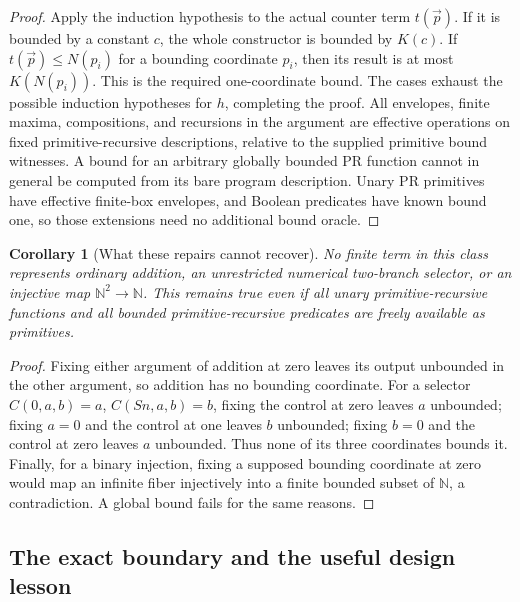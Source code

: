 \documentclass[11pt,letterpaper]{article}
\newtheorem{corollary}[theorem]{Corollary}
\theoremstyle{definition}\newtheorem{definition}[theorem]{Definition}
\theoremstyle{remark}\newtheorem{remark}[theorem]{Remark}
\begin{document}
\begin{proof}
Apply the induction hypothesis to the actual counter term $t(\vec p)$.
If it is bounded by a constant $c$, the whole constructor is bounded by
$K(c)$.  If $t(\vec p)\le N(p_i)$ for a bounding coordinate $p_i$, then
its result is at most $K(N(p_i))$.  This is the required one-coordinate
bound.  The cases exhaust the possible induction hypotheses for $h$,
completing the proof.  All envelopes, finite maxima, compositions, and
recursions in the argument are effective operations on fixed
primitive-recursive descriptions, relative to the supplied primitive bound
witnesses. A bound for an arbitrary globally bounded PR function cannot in
general be computed from its bare program description. Unary PR primitives
have effective finite-box envelopes, and Boolean predicates have known
bound one, so those extensions need no additional bound oracle.
\end{proof}

\begin{corollary}[What these repairs cannot recover]
\label{cor:single-body-exclusions}
No finite term in this class represents ordinary addition, an unrestricted
numerical two-branch selector, or an injective map
$\mathbb N^2\longrightarrow\mathbb N$.
This remains true even if all unary primitive-recursive functions and all
bounded primitive-recursive predicates are freely available as primitives.
\end{corollary}
\begin{proof}
Fixing either argument of addition at zero leaves its output unbounded
in the other argument, so addition has no bounding coordinate.
For a selector $C(0,a,b)=a$, $C(Sn,a,b)=b$, fixing the control at zero
leaves $a$ unbounded; fixing $a=0$ and the control at one leaves $b$
unbounded; fixing $b=0$ and the control at zero leaves $a$ unbounded.
Thus none of its three coordinates bounds it.  Finally, for a binary
injection, fixing a supposed bounding coordinate at zero would map an
infinite fiber injectively into a finite bounded subset of $\mathbb N$,
a contradiction.  A global bound fails for the same reasons.
\end{proof}

\subsection{The exact boundary and the useful design lesson}
\end{document}
